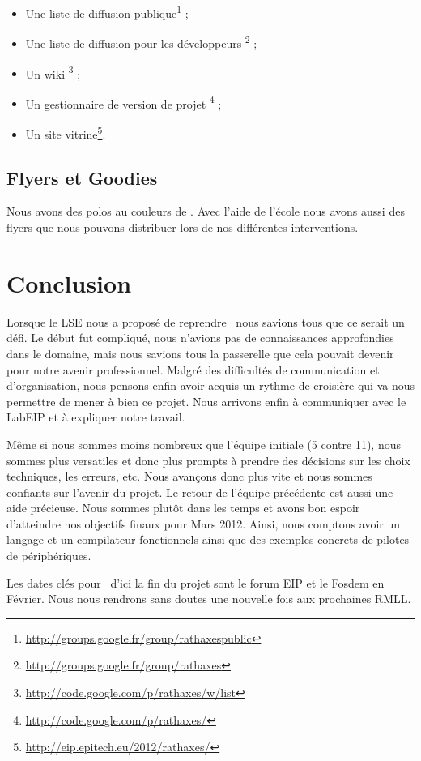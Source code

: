 \documentclass[francais]{rtxreport}
\begin{document}
\begin{itemize}
\item Une liste de diffusion publique\footnote{\url{http://groups.google.fr/group/rathaxespublic}} ;
\item Une liste de diffusion pour les développeurs \footnote{\url{http://groups.google.fr/group/rathaxes}} ;
\item Un wiki \footnote{\url{http://code.google.com/p/rathaxes/w/list}} ;
\item Un gestionnaire de version de projet \footnote{\url{http://code.google.com/p/rathaxes/}} ;
\item Un site vitrine\footnote{\url{http://eip.epitech.eu/2012/rathaxes/}}.
\end{itemize}


\section{Flyers et Goodies}

Nous avons des polos au couleurs de \rtx. Avec l'aide de l'école nous avons
aussi des flyers que nous pouvons distribuer lors de nos différentes
interventions.

\chapter{Conclusion}


Lorsque le LSE nous a proposé de reprendre \rtx\ nous savions tous que ce
serait un défi. Le début fut compliqué, nous n’avions pas de connaissances
approfondies dans le domaine, mais nous savions tous la passerelle que cela
pouvait devenir pour notre avenir professionnel. Malgré des difficultés de
communication et d’organisation, nous pensons enfin avoir acquis un rythme de
croisière qui va nous permettre de mener à bien ce projet. Nous arrivons enfin
à communiquer avec le LabEIP et à expliquer notre travail.

Même si nous sommes moins nombreux que l’équipe initiale (5 contre 11), nous
sommes plus versatiles et donc plus prompts à prendre des décisions sur les
choix techniques, les erreurs, etc. Nous avançons donc plus vite et nous sommes
confiants sur l’avenir du projet. Le retour de l'équipe précédente est aussi
une aide précieuse. Nous sommes plutôt dans les temps et avons bon espoir
d'atteindre nos objectifs finaux pour Mars 2012. Ainsi, nous comptons avoir un
langage et un compilateur fonctionnels ainsi que des exemples concrets de
pilotes de périphériques.

Les dates clés pour \rtx\ d'ici la fin du projet sont le forum EIP et le Fosdem
en Février. Nous nous rendrons sans doutes une nouvelle fois aux prochaines
RMLL.
\end{document}
